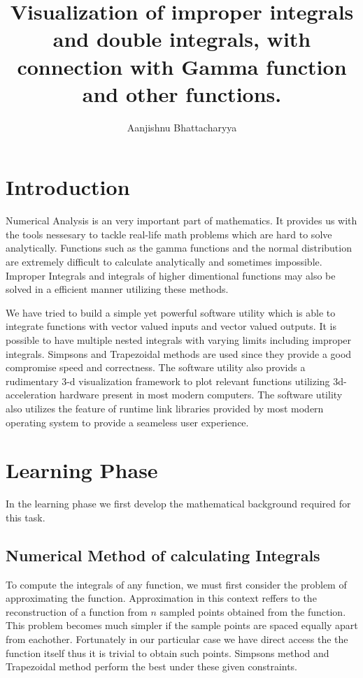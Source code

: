 \documentclass[12pt]{article}
\title{Visualization of improper integrals and double integrals, with connection with Gamma function and other functions.}
\author{Aanjishnu Bhattacharyya}
\begin{document}
\maketitle
\tableofcontents
\newpage

\section{Introduction}

Numerical Analysis is an very important part of mathematics. It provides us with the tools nessesary to tackle
real-life math problems which are hard to solve analytically. Functions such as the gamma functions and the normal
distribution are extremely difficult to calculate analytically and sometimes impossible. Improper Integrals and
integrals of higher dimentional functions may also be solved in a efficient manner utilizing these methods.

We have tried to build a simple yet powerful software utility which is able to integrate functions with vector valued
inputs and vector valued outputs. It is possible to have multiple nested integrals with varying limits including improper
integrals. Simpsons and Trapezoidal methods are used since they provide a good compromise speed and correctness.
The software utility also provids a rudimentary 3-d visualization framework to plot relevant functions utilizing 3d-acceleration 
hardware present in most modern computers. The software utility also utilizes the feature of runtime link libraries
provided by most modern operating system to provide a seameless user experience.

\section{Learning Phase}

In the learning phase we first develop the mathematical background required for this task.

\subsection{Numerical Method of calculating Integrals}

To compute the integrals of any function, we must first consider the problem of approximating the function\cite{bb}.
Approximation in this context reffers to the reconstruction of a function from $n$ sampled points obtained
from the function. This problem becomes much simpler if the sample points are spaced equally apart from eachother.
Fortunately in our particular case we have direct access the the function itself thus it is trivial to obtain such
points. Simpsons method and Trapezoidal method perform the best under these given constraints.
\break
\break
\end{document}
